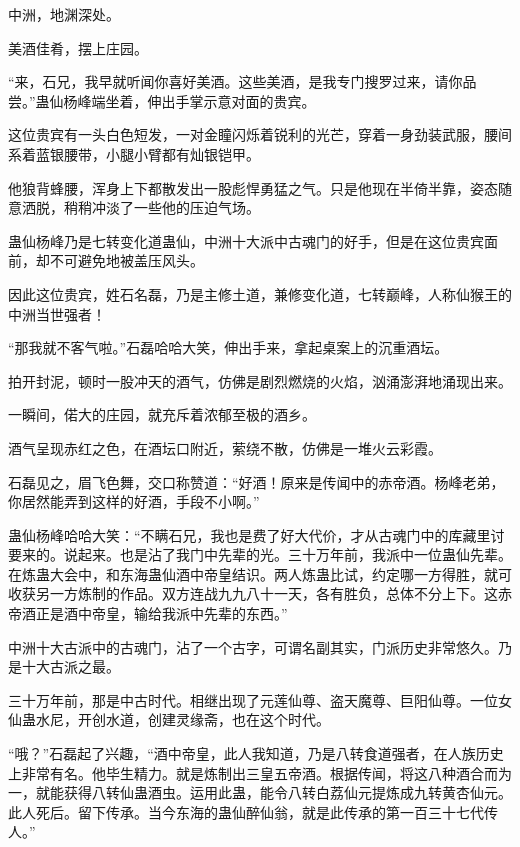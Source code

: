 
\begin{this_body}

中洲，地渊深处。

美酒佳肴，摆上庄园。

“来，石兄，我早就听闻你喜好美酒。这些美酒，是我专门搜罗过来，请你品尝。”蛊仙杨峰端坐着，伸出手掌示意对面的贵宾。

这位贵宾有一头白色短发，一对金瞳闪烁着锐利的光芒，穿着一身劲装武服，腰间系着蓝银腰带，小腿小臂都有灿银铠甲。

他狼背蜂腰，浑身上下都散发出一股彪悍勇猛之气。只是他现在半倚半靠，姿态随意洒脱，稍稍冲淡了一些他的压迫气场。

蛊仙杨峰乃是七转变化道蛊仙，中洲十大派中古魂门的好手，但是在这位贵宾面前，却不可避免地被盖压风头。

因此这位贵宾，姓石名磊，乃是主修土道，兼修变化道，七转巅峰，人称仙猴王的中洲当世强者！

“那我就不客气啦。”石磊哈哈大笑，伸出手来，拿起桌案上的沉重酒坛。

拍开封泥，顿时一股冲天的酒气，仿佛是剧烈燃烧的火焰，汹涌澎湃地涌现出来。

一瞬间，偌大的庄园，就充斥着浓郁至极的酒乡。

酒气呈现赤红之色，在酒坛口附近，萦绕不散，仿佛是一堆火云彩霞。

石磊见之，眉飞色舞，交口称赞道：“好酒！原来是传闻中的赤帝酒。杨峰老弟，你居然能弄到这样的好酒，手段不小啊。”

蛊仙杨峰哈哈大笑：“不瞒石兄，我也是费了好大代价，才从古魂门中的库藏里讨要来的。说起来。也是沾了我门中先辈的光。三十万年前，我派中一位蛊仙先辈。在炼蛊大会中，和东海蛊仙酒中帝皇结识。两人炼蛊比试，约定哪一方得胜，就可收获另一方炼制的作品。双方连战九九八十一天，各有胜负，总体不分上下。这赤帝酒正是酒中帝皇，输给我派中先辈的东西。”

中洲十大古派中的古魂门，沾了一个古字，可谓名副其实，门派历史非常悠久。乃是十大古派之最。

三十万年前，那是中古时代。相继出现了元莲仙尊、盗天魔尊、巨阳仙尊。一位女仙蛊水尼，开创水道，创建灵缘斋，也在这个时代。

“哦？”石磊起了兴趣，“酒中帝皇，此人我知道，乃是八转食道强者，在人族历史上非常有名。他毕生精力。就是炼制出三皇五帝酒。根据传闻，将这八种酒合而为一，就能获得八转仙蛊酒虫。运用此蛊，能令八转白荔仙元提炼成九转黄杏仙元。此人死后。留下传承。当今东海的蛊仙醉仙翁，就是此传承的第一百三十七代传人。”


\end{this_body}
